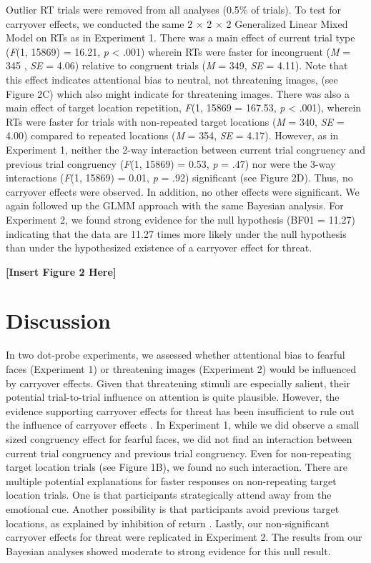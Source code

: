 \documentclass{article}
\begin{document}
Outlier RT trials were removed from all analyses (0.5\% of trials). To test for carryover effects, we conducted the same 2 × 2 × 2 Generalized Linear Mixed Model on RTs as in Experiment 1. There was a main effect of current trial type (\emph{F}(1, 15869) = 16.21, \emph{p }< .001) wherein RTs were faster for incongruent (\emph{M }= 345 , \emph{SE }= 4.06) relative to congruent trials (\emph{M }= 349, \emph{SE }= 4.11). Note that this effect indicates attentional bias to neutral, not threatening images, (see Figure 2C) which also might indicate for threatening images. There was also a main effect of target location repetition, \emph{F}(1, 15869 = 167.53, \emph{p }< .001), wherein RTs were faster for trials with non-repeated target locations (\emph{M }= 340, \emph{SE }= 4.00) compared to repeated locations (\emph{M }= 354, \emph{SE }= 4.17). However, as in Experiment 1, neither the 2-way interaction between current trial congruency and previous trial congruency (\emph{F}(1, 15869) = 0.53, \emph{p }= .47) nor were the 3-way interactions (\emph{F}(1, 15869) = 0.01, \emph{p }= .92) significant (see Figure 2D). Thus, no carryover effects were observed. In addition, no other effects were significant. We again followed up the GLMM approach with the same Bayesian analysis. For Experiment 2, we found strong evidence for the null hypothesis (BF01 = 11.27) indicating that the data are 11.27 times more likely under the null hypothesis than under the hypothesized existence of a carryover effect for threat. 

\textbf{[Insert Figure 2 Here]}

\section{Discussion}

In two dot-probe experiments, we assessed whether attentional bias to fearful faces (Experiment 1) or threatening images (Experiment 2) would be influenced by carryover effects. Given that threatening stimuli are especially salient, their potential trial-to-trial influence on attention is quite plausible. However, the evidence supporting carryover effects for threat has been insufficient to rule out the influence of carryover effects \parencite{Gladwin2019a, Hill2016}. In Experiment 1, while we did observe a small sized congruency effect for fearful faces, we did not find an interaction between current trial congruency and previous trial congruency. Even for non-repeating target location trials (see Figure 1B), we found no such interaction. There are multiple potential explanations for faster responses on non-repeating target location trials. One is that participants strategically attend away from the emotional cue. Another possibility is that participants avoid previous target locations, as explained by inhibition of return \parencite{Posner1985}. Lastly, our non-significant carryover effects for threat were replicated in Experiment 2. The results from our Bayesian analyses showed moderate to strong evidence for this null result. 
\end{document}
